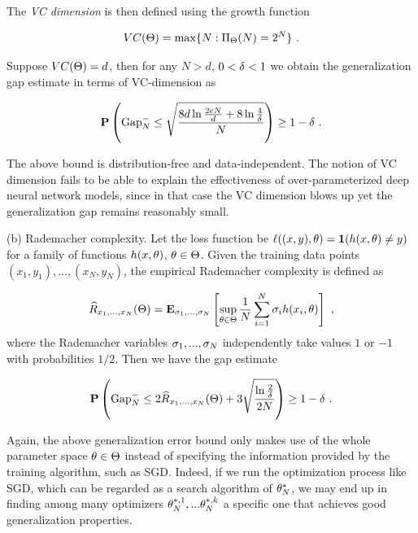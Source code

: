 The \textit{VC dimension} is then defined using the growth function

\begin{equation}\label{Eq:VC-dimension}
VC(\Theta)=\max\{N: \Pi_{\Theta}(N)=2^N\} \ .
\end{equation}

Suppose $VC(\Theta)=d$, then for any $N>d$, $0<\delta<1$ we obtain the generalization gap estimate
in terms of VC-dimension as

\begin{equation}\label{Eq:Gap-Estimate-VC-dimension}
\mathbf P\left(\text{Gap}_N^- \leq \sqrt{\dfrac{8d\ln\frac{2eN}{d}+8\ln\frac{4}{\delta}}{N}}\right)\geq 1-\delta \ .
\end{equation}

The above bound is distribution-free and data-independent. The notion of VC dimension fails to be able to explain
the effectiveness of over-parameterized deep neural network models, since in that case the VC dimension blows up
yet the generalization gap remains reasonably small.

(b) Rademacher complexity. Let the loss function be $\ell((x,y), \theta)=\mathbf 1(h(x,\theta)\neq y)$ for a family of functions $h(x,\theta)$, $\theta\in \Theta$.
Given the training data points $(x_1, y_1) , ... , (x_N, y_N)$, the empirical Rademacher complexity is defined as

\begin{equation}\label{Eq:EmpiricalRademacherComplexity}
\widehat{R}_{x_1,...,x_N}(\Theta)=\mathbf E_{\sigma_1,...,\sigma_N}\left[\sup\limits_{\theta\in\Theta}\dfrac{1}{N}\sum\limits_{i=1}^N \sigma_i h(x_i, \theta)\right] \ ,
\end{equation}
where the Rademacher variables $\sigma_1,...,\sigma_N$ independently take values $1$ or $-1$ with probabilities $1/2$. Then we have
the gap estimate

\begin{equation}\label{Eq:Gap-Estimate-Rademacher}
\mathbf P\left(\text{Gap}_N^-\leq 2\widehat{R}_{x_1,...,x_N}(\Theta)+3\sqrt{\dfrac{\ln\frac{2}{\delta}}{2N}}\right)\geq 1-\delta \ .
\end{equation}

Again, the above generalization error bound only makes use of the whole parameter space $\theta\in \Theta$ instead of 
specifying the information provided by the training algorithm, such as SGD. 
Indeed, if we run the optimization process like SGD, which can be regarded as
a search algorithm of $\theta_N^*$, we may end up in finding among many optimizers $\theta_N^{*,1},...\theta_N^{*,k}$
a specific one that achieves good generalization properties.


